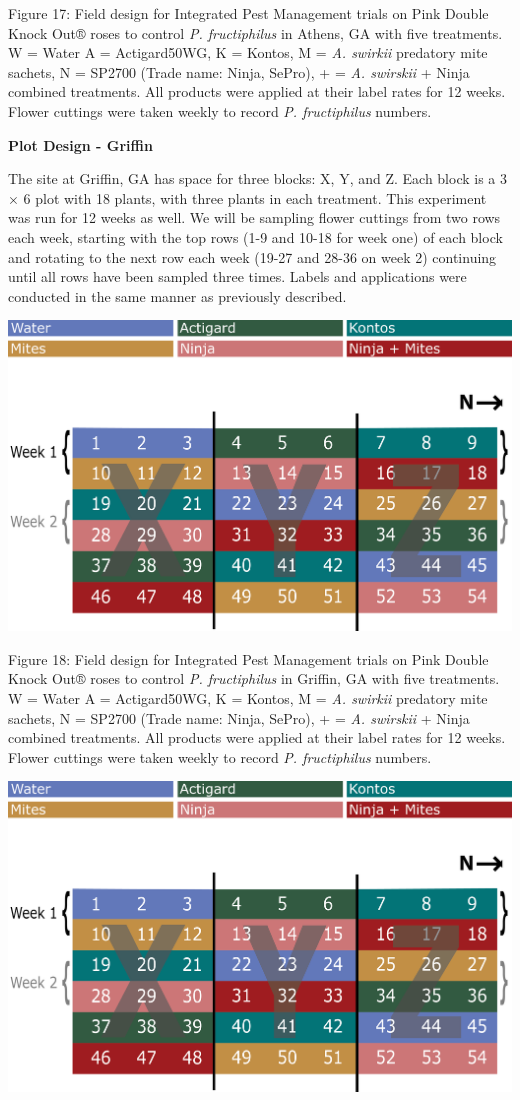 \documentclass[12pt,final,CPage]{ufthesis}
\begin{document}
{  Figure 17: Field design for Integrated Pest Management trials on Pink Double Knock Out® roses to control \emph{P. fructiphilus} in Athens, GA with five treatments. W = Water A = Actigard50WG, K = Kontos, M = \emph{A. swirkii} predatory mite sachets, N = SP2700 (Trade name: Ninja, SePro), + = \emph{A. swirskii} + Ninja combined treatments. All products were applied at their label rates for 12 weeks. Flower cuttings were taken weekly to record \emph{P. fructiphilus} numbers.

  \textbf{Plot Design - Griffin}

  The site at Griffin, GA has space for three blocks: X, Y, and Z. Each block is a 3 \(\times\) 6 plot with 18 plants, with three plants in each treatment. This experiment was run for 12 weeks as well. We will be sampling flower cuttings from two rows each week, starting with the top rows (1-9 and 10-18 for week one) of each block and rotating to the next row each week (19-27 and 28-36 on week 2) continuing until all rows have been sampled three times. Labels and applications were conducted in the same manner as previously described.
  \begin{center}\includegraphics[width=0.8\linewidth]{figure/rrv_ipm_plot_map_2019_griffin} \end{center}

  Figure 18: Field design for Integrated Pest Management trials on Pink Double Knock Out® roses to control \emph{P. fructiphilus} in Griffin, GA with five treatments. W = Water A = Actigard50WG, K = Kontos, M = \emph{A. swirkii} predatory mite sachets, N = SP2700 (Trade name: Ninja, SePro), + = \emph{A. swirskii} + Ninja combined treatments. All products were applied at their label rates for 12 weeks. Flower cuttings were taken weekly to record \emph{P. fructiphilus} numbers.
  \begin{center}\includegraphics[width=0.8\linewidth]{figure/rrv_ipm_plot_map_2019_griffin} \end{center}

}
\end{document}
